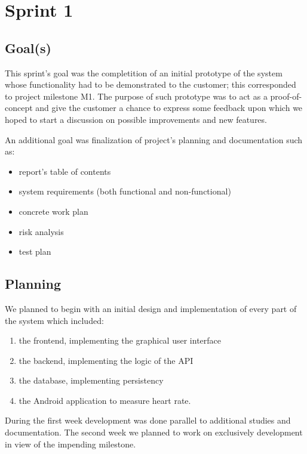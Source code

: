 

\chapter{Sprint 1}
\label{Sprint0}

\section{Goal(s)}

This sprint's goal was the completition of an initial prototype of the system whose functionality
had to be demonstrated to the customer; this corresponded to project milestone M1.
The purpose of such prototype was to act as a proof-of-concept and give the customer
a chance to express some feedback upon which we hoped to start a discussion
on possible improvements and new features.

An additional goal was finalization of project's planning and documentation such as:
\begin{itemize}
\item report's table of contents
\item system requirements (both functional and non-functional)
\item concrete work plan
\item risk analysis
\item test plan
\end{itemize}

\section{Planning}

We planned to begin with an initial design and implementation of every part of the system which included:
\begin{enumerate}
\item the frontend, implementing the graphical user interface
\item the backend, implementing the logic of the API
\item the database, implementing persistency
\item the Android application to measure heart rate.
\end{enumerate}

During the first week development was done parallel to additional studies and documentation.
The second week we planned to work on exclusively development in view of the impending milestone.

